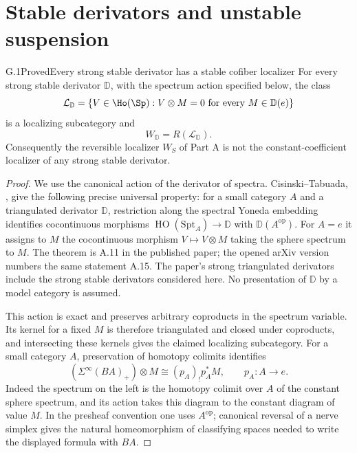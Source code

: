 \section{Stable derivators and unstable suspension}
\providecommand{\D}{\mathbb D}
\providecommand{\HoSp}{\Ho(\Sp)}

\begin{claim}{G.1}{Proved}{Every strong stable derivator has a stable cofiber localizer}
For every strong stable derivator $\D$, with the spectrum action specified below, the class
\[
 \mathcal L_{\D}=
 \{V\in\HoSp:V\otimes M=0\text{ for every }M\in\D(e)\}
\]
is a localizing subcategory and
\[
 W_{\D}=R(\mathcal L_{\D}).
\]
Consequently the reversible localizer $W_S$ of Part A is not the constant-coefficient localizer of any strong stable derivator.
\end{claim}
\begin{proof}
We use the canonical action of the derivator of spectra. Cisinski--Tabuada, \cite[Theorem A.11 and Appendix A.3]{FGHCT2011}, give the following precise universal property: for a small category $A$ and a triangulated derivator $\D$, restriction along the spectral Yoneda embedding identifies cocontinuous morphisms $\operatorname{HO}(\mathrm{Spt}_A)\to\D$ with $\D(A^{\mathrm{op}})$. For $A=e$ it assigns to $M$ the cocontinuous morphism $V\mapsto V\otimes M$ taking the sphere spectrum to $M$. The theorem is A.11 in the published paper; the opened arXiv version numbers the same statement A.15. The paper's strong triangulated derivators include the strong stable derivators considered here. No presentation of $\D$ by a model category is assumed.

This action is exact and preserves arbitrary coproducts in the spectrum variable. Its kernel for a fixed $M$ is therefore triangulated and closed under coproducts, and intersecting these kernels gives the claimed localizing subcategory. For a small category $A$, preservation of homotopy colimits identifies
\[
 (\Sigma^\infty(BA)_+)\otimes M
 \cong (p_A)_!p_A^*M,
 \qquad p_A:A\to e.
\]
Indeed the spectrum on the left is the homotopy colimit over $A$ of the constant sphere spectrum, and its action takes this diagram to the constant diagram of value $M$. In the presheaf convention one uses $A^{\mathrm{op}}$; canonical reversal of a nerve simplex gives the natural homeomorphism of classifying spaces needed to write the displayed formula with $BA$.


\end{proof}
